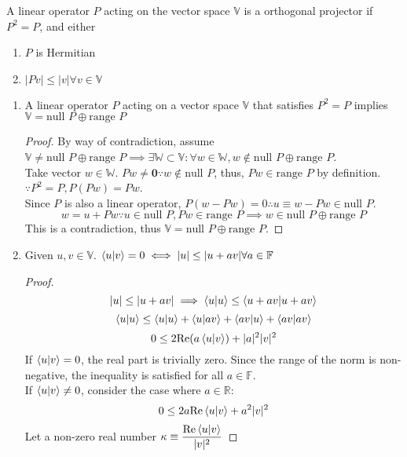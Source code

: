 \begin{sol}

\begin{theorem}
A linear operator $P$ acting on the vector space $\mathbb V$ is a orthogonal projector if $P^2=P$, and either
\begin{enumerate}
\item
$P$ is Hermitian
\item 
$|Pv|\leq|v|\forall v\in\mathbb V$
\end{enumerate}
 \end{theorem}
 \begin{enumerate}[label=\textbf{(\alph*)}]
 \item
\begin{lemma}
A linear operator $P$ acting on a vector space $\mathbb V$ that satisfies $P^2=P$ implies $\mathbb V=\text{null } P\oplus \text{range } P$ 
\end{lemma}
\begin{proof}
By way of contradiction, assume $\mathbb V\neq \text{null }P\oplus\text{range }P\implies\exists\mathbb W\subset\mathbb V:\forall w\in\mathbb W, w\notin\text{null }P\oplus\text{range }P$. \\
Take vector $w\in\mathbb W$. $Pw\neq \mathbf{0}\because w\notin\text{null }P$, thus, $Pw\in \text{range }P$ by definition.\\ $\because P^2=P, P(Pw)=Pw$. \\Since $P$ is also a linear operator, $P(w-Pw)=0\therefore u\equiv w-Pw\in \text{null }P$.
$$w=u+Pw\because u\in\text{null }P,Pw\in\text{range } P\implies w\in\text{null }P\oplus\text{range }P$$ 
This is a contradiction, thus $\mathbb V=\text{null }P\oplus\text{range }P$.
\end{proof}
\item
\begin{lemma}
Given $u,v\in\mathbb V$. $\braket{u}{v}=0\iff|u|\leq|u+av|\forall a\in \mathbb F$ 
\end{lemma}
\begin{proof}
$$ |u|\leq|u+av|\implies\braket{u}{u}\leq\braket{u+av}{u+av}$$ $$\braket{u}{u}\leq\braket{u}{u}+\braket{u}{av}+\braket{av}{u}+\braket{av}{av}$$
$$0\leq 2\text{Re}(a\braket{u}{v})+|a|^2|v|^2$$ 
If $\braket{u}{v}=0$, the real part is trivially zero. Since the range of the norm is non-negative, the inequality is satisfied for all $a\in\mathbb F$.\\
If $\braket{u}{v}\neq 0$, consider the case where $a\in\mathbb R$:
$$0\leq 2a\text{Re}\braket{u}{v}+a^2|v|^2$$ 
Let a non-zero real number $\displaystyle{\kappa\equiv\frac{\text{Re}\braket{u}{v}}{|v|^2}}$ 

\end{proof}
\end{enumerate}
\end{sol}
